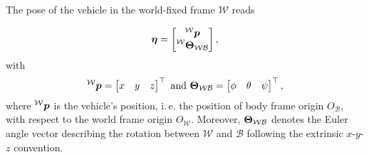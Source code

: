 The pose of the vehicle in the world-fixed frame $\mathcal{W}$ reads

\begin{equation}
	\etab = 
	\begin{bmatrix}
		\prescript{\mathcal{W}}{}{\pbo} \\
		\prescript{\mathcal{W}}{}{\Theb_{\mathcal{W}\mathcal{B}}}
	\end{bmatrix}
	,
\end{equation}
with
\begin{equation}
	\prescript{\mathcal{W}}{}{\mbox{$\bm{p}$}} = 
	\begin{bmatrix}
		x & y & z
	\end{bmatrix}^\top
	\text{ and }
	\mbox{$\bm{\Theta}$}_{\mathcal{W}\mathcal{B}} =
	\begin{bmatrix}
		\phi & \theta & \psi
	\end{bmatrix}^\top,
\end{equation}
where $\prescript{\mathcal{W}}{}{\mbox{$\bm{p}$}}$ is the vehicle's position, i.\,e. the position of body frame origin $O_\mathcal{B}$, with respect to the world frame origin $O_\mathcal{W}$.
Moreover, $\mbox{$\bm{\Theta}$}_{\mathcal{W}\mathcal{B}}$ denotes the Euler angle vector describing the rotation between $\mathcal{W}$ and $\mathcal{B}$ following the extrinsic $x$-$y$-$z$ convention.

